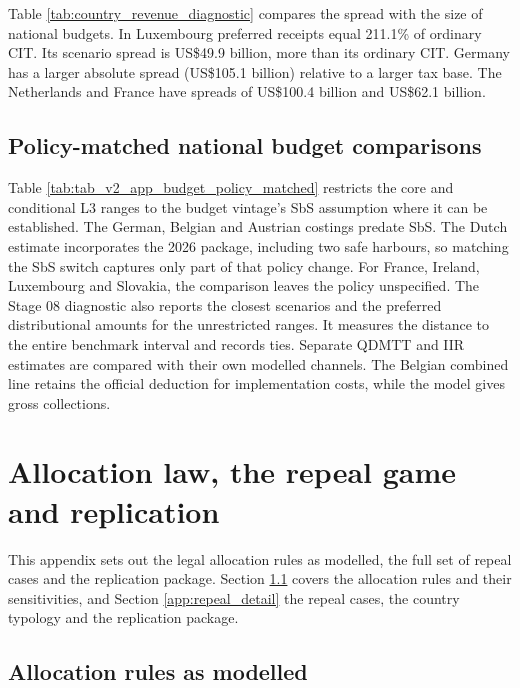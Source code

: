\documentclass[11pt,a4paper]{article}
\newcommand{\usd}{US\$}
\begin{document}


Table \ref{tab:country_revenue_diagnostic} compares the spread with the size of national budgets. In Luxembourg preferred receipts equal 211.1\% of ordinary CIT. Its scenario spread is \usd49.9 billion, more than its ordinary CIT. Germany has a larger absolute spread (\usd105.1 billion) relative to a larger tax base. The Netherlands and France have spreads of \usd100.4 billion and \usd62.1 billion.

\clearpage
\subsection{Policy-matched national budget comparisons}\label{app:budget_benchmarks}

Table \ref{tab:tab_v2_app_budget_policy_matched} restricts the core and conditional L3 ranges to the budget vintage's SbS assumption where it can be established. The German, Belgian and Austrian costings predate SbS. The Dutch estimate incorporates the 2026 package, including two safe harbours, so matching the SbS switch captures only part of that policy change. For France, Ireland, Luxembourg and Slovakia, the comparison leaves the policy unspecified. The Stage 08 diagnostic also reports the closest scenarios and the preferred distributional amounts for the unrestricted ranges. It measures the distance to the entire benchmark interval and records ties. Separate QDMTT and IIR estimates are compared with their own modelled channels. The Belgian combined line retains the official deduction for implementation costs, while the model gives gross collections.




\section{Allocation law, the repeal game and replication}\label{app:allocation}

This appendix sets out the legal allocation rules as modelled, the full set of repeal cases and the replication package. Section \ref{app:allocation_detail} covers the allocation rules and their sensitivities, and Section \ref{app:repeal_detail} the repeal cases, the country typology and the replication package.

\subsection{Allocation rules as modelled}\label{app:allocation_detail}
\end{document}

